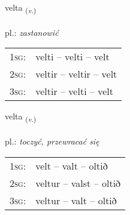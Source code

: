 \documentclass[frontgrid, backgrid]{flacards}\usepackage[]{graphicx}\usepackage[]{xcolor}
\begin{document}
\renewcommand{\flhead}{\vskip5pt \fboxsep=0pt {\small\bfseries\footnotesize Sagnorð | Verb}}
\renewcommand{\fcfoot}{\vskip5pt \fboxsep=0pt \hspace{2pt}{\small\bfseries\footnotesize 1K}}

\renewcommand{\blhead}{\vskip5pt {\small\bfseries\footnotesize Sagnorð | Verb }}
\renewcommand{\bcfoot}{\vskip5pt \hspace{2pt}{\small\bfseries\footnotesize 1K}}


{velta \small{\textsubscript{(\textit{v.})}} \\[1ex] %
\textphonetic{[vɛl̥ta]} \\
pl.: \emph{zastanowić} \\  [2ex]
\renewcommand*{\arraystretch}{0.8}
\begin{tabular}{p{1cm}l}
\textsc{1sg}: & velti -- velti -- velt \\ 
\textsc{2sg}: & veltir -- veltir -- velt \\ 
\textsc{3sg}: & veltir -- velti -- velt \\ 
\end{tabular}
}

\renewcommand{\flhead}{\vskip5pt \fboxsep=0pt {\small\bfseries\footnotesize Sagnorð | Verb}}
\renewcommand{\fcfoot}{\vskip5pt \fboxsep=0pt \hspace{2pt}{\small\bfseries\footnotesize 1K}}

\renewcommand{\blhead}{\vskip5pt {\small\bfseries\footnotesize Sagnorð | Verb }}
\renewcommand{\bcfoot}{\vskip5pt \hspace{2pt}{\small\bfseries\footnotesize 1K}}


{velta \small{\textsubscript{(\textit{v.})}} \\[1ex] %
\textphonetic{[vɛl̥ta]} \\
pl.: \emph{toczyć, przewracać się} \\  [2ex]
\renewcommand*{\arraystretch}{0.8}
\begin{tabular}{p{1cm}l}
\textsc{1sg}: & velt -- valt -- oltið \\ 
\textsc{2sg}: & veltur -- valst -- oltið \\ 
\textsc{3sg}: & veltur -- valt -- oltið \\ 
\end{tabular}
}
\end{document}
